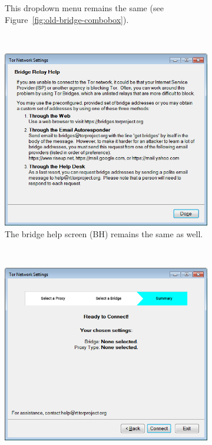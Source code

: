 \documentclass[USenglish,oneside,twocolumn]{article}
\begin{document}
\begin{figure}
\begin{subfigure}[b]{0.30\textwidth}
	\centering\captionsetup{width=1.5\linewidth}%
	\caption{This dropdown menu remains the same (see Figure~\ref{fig:old-bridge-combobox}).}
	\label{fig:new-bridge-combobox}
\end{subfigure}
~~~~~~~~~~~~~~~~~~~~~~~~~
\begin{subfigure}[b]{0.30\textwidth}
	\includegraphics[width=\textwidth]{screenshots/NEW-bridgeHelp.png}
	\centering\captionsetup{width=1.5\linewidth}%
	\caption{The bridge help screen (BH) remains the same as well.}
	\label{fig:new-bridge-help}
\end{subfigure}
~~~~~~~~~~
\begin{subfigure}[b]{0.30\textwidth}
	\includegraphics[width=\textwidth]{screenshots/NEW-summary.png}

\end{subfigure}
\end{figure}
\end{document}
